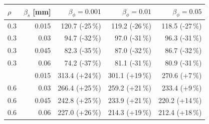 \begin{tabular}{lrrrr}
\toprule
$\rho$ & $\beta_s$ [mm] & $\beta_\phi=0.001$ & $\beta_\phi=0.01$ & $\beta_\phi=0.05$ \\
\midrule
0.3 & 0.015 & 120.7 (-25\,\%) & 119.2 (-26\,\%) & 118.5 (-27\,\%) \\
0.3 & 0.03 & 94.7 (-32\,\%) & 97.0 (-31\,\%) & 96.3 (-31\,\%) \\
0.3 & 0.045 & 82.3 (-35\,\%) & 87.0 (-32\,\%) & 86.7 (-32\,\%) \\
0.3 & 0.06 & 74.2 (-37\,\%) & 81.1 (-31\,\%) & 80.9 (-31\,\%) \\
\addlinespace
0.6 & 0.015 & 313.4 (+24\,\%) & 301.1 (+19\,\%) & 270.6 (+7\,\%) \\
0.6 & 0.03 & 266.4 (+25\,\%) & 259.2 (+21\,\%) & 233.4 (+9\,\%) \\
0.6 & 0.045 & 242.8 (+25\,\%) & 233.9 (+21\,\%) & 220.2 (+14\,\%) \\
0.6 & 0.06 & 227.0 (+26\,\%) & 214.3 (+19\,\%) & 212.4 (+18\,\%) \\
\bottomrule
\end{tabular}
